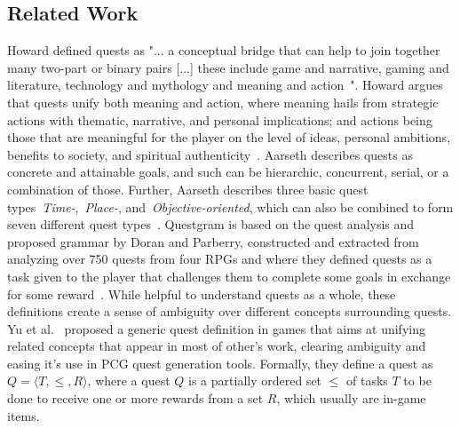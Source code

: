 \subsection{Related Work}

Howard defined quests as "... a conceptual bridge that can help to join together many two-part or binary pairs [...] these include game and narrative, gaming and literature, technology and mythology and meaning and action~". Howard argues that quests unify both meaning and action, where meaning hails from strategic actions with thematic, narrative, and personal implications; and actions being those that are meaningful for the player on the level of ideas, personal ambitions, benefits to society, and spiritual authenticity~. Aarseth describes quests as concrete and attainable goals, and such can be hierarchic, concurrent, serial, or a combination of those. Further, Aarseth describes three basic quest types~\emph{Time-},~\emph{Place-}, and~\emph{Objective-oriented}, which can also be combined to form seven different quest types~. Questgram is based on the quest analysis and proposed grammar by Doran and Parberry, constructed and extracted from analyzing over 750 quests from four RPGs and where they defined quests as a task given to the player that challenges them to complete some goals in exchange for some reward~. While helpful to understand quests as a whole, these definitions create a sense of ambiguity over different concepts surrounding quests. Yu et al.~ proposed a generic quest definition in games that aims at unifying related concepts that appear in most of other's work, clearing ambiguity and easing it's use in PCG quest generation tools. Formally, they define a quest as $Q = \langle T, \leq, R \rangle$, where a quest $Q$ is a partially ordered set $\leq$ of tasks $T$ to be done to receive one or more rewards from a set $R$, which usually are in-game items.


